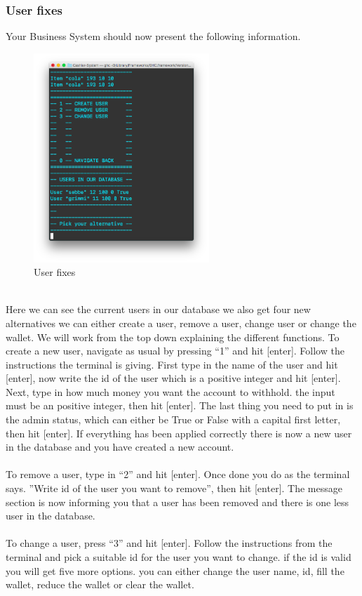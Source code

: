 \documentclass[11pt]{article}
\begin{document}
\subsubsection{User fixes}
Your Business System should now present the following information.
\\
\begin{figure}[h!]
  \includegraphics[width=250px]{interface7.png}
  \caption{User fixes}
\end{figure}
\\
Here we can see the current users in our database we also get four new alternatives we can either create a user, remove a user, change user or change the wallet. We will work from the top down explaining the different functions.
\newpage
To create a new user, navigate as usual by pressing “1” and hit [enter]. Follow the instructions the terminal is giving. First type in the name of the user and hit [enter], now write the id of the user which is a positive integer and hit [enter]. Next, type in how much money you want the account to withhold. the input must be an positive integer, then hit [enter]. The last thing you need to put in is the admin status, which can either be True or False with a capital first letter, then hit [enter]. If everything has been applied correctly there is now a new user in the database and you have created a new account.\\\\
To remove a user, type in “2” and hit [enter]. Once done you do as the terminal says. ”Write id of the user you want to remove”,  then hit [enter]. The message section is now informing you that a user has been removed and there is one less user in the database.\\\\
To change a user, press “3” and hit [enter]. Follow the instructions from the terminal and pick a suitable id for the user you want to change. if the id is valid you will get five more options. you can either change the user name, id, fill the wallet, reduce the wallet or clear the wallet.
\end{document}

